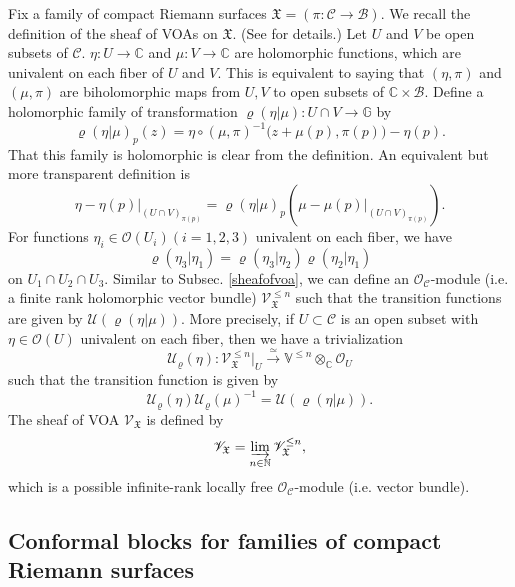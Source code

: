 \documentclass[11pt,b5paper,notitlepage]{article}
\theoremstyle{definition}
\theoremstyle{plain}
\newcommand{\mc}{\mathcal}
\newcommand{\SV}{\mathscr{V}}
\newcommand{\Vbb}{\mathbb V}
\newcommand{\Gbb}{\mathbb G}
\newcommand{\Cbb}{\mathbb C}
\newcommand{\Nbb}{\mathbb N}
\newcommand{\<}{\left\langle}
\renewcommand{\>}{\right\rangle}
\newcommand{\MO}{\mathcal{O}}
\newcommand{\MU}{\mathcal{U}}
\newcommand{\MC}{\mathcal{C}}
\newcommand{\MB}{\mathcal{B}}
\newcommand{\fx}{\mathfrak{X}}
\numberwithin{equation}{subsection}
\begin{document}
Fix a family of compact Riemann surfaces $\fx=(\pi:\MC\rightarrow \MB)$. We recall the definition of the sheaf of VOAs on $\fx$. (See \cite[Sec. 5]{Gui-sewingconvergence} for details.) Let $U$ and $V$ be open subsets of $\MC$. $\eta:U\rightarrow \Cbb$ and $\mu:V\rightarrow \Cbb$ are holomorphic functions, which are univalent on each fiber of $U$ and $V$. This is equivalent to saying that $(\eta,\pi)$ and $(\mu,\pi)$ are biholomorphic maps from $U,V$ to open subsets of $\Cbb\times \MB$. Define a holomorphic family of transformation $\varrho(\eta\vert \mu):U\cap V\rightarrow \Gbb$ by 
$$
\varrho(\eta\vert \mu)_p(z)=\eta\circ (\mu,\pi)^{-1}\big(z+\mu(p),\pi(p)\big)-\eta(p).
$$
That this family is holomorphic is clear from the definition. An equivalent but more transparent definition is
$$
\eta-\eta(p)\vert_{(U\cap V)_{\pi(p)}}=\varrho(\eta\vert \mu)_p(\mu-\mu(p)\vert_{(U\cap V)_{\pi(p)}}).
$$
For functions $\eta_i\in \MO(U_i)(i=1,2,3)$ univalent on each fiber, we have
$$
\varrho(\eta_3\vert \eta_1)=\varrho(\eta_3\vert \eta_2)\varrho(\eta_2\vert \eta_1)
$$
on $U_1\cap U_2\cap U_3$. Similar to Subsec. \ref{sheafofvoa}, we can define an $\mc O_{\mc C}$-module  (i.e. a finite rank holomorphic vector bundle) $\SV_{\fx}^{\leq n}$ such that the transition functions are given by $\MU(\varrho(\eta\vert \mu))$. More precisely, if $U\subset \MC$ is an open subset with $\eta\in \MO(U)$ univalent on each fiber, then we have a trivialization
$$
\MU_\varrho(\eta):\SV_\fx^{\leq n}\vert_{U}\xrightarrow{\simeq }\Vbb^{\leq n}\otimes_{\Cbb} \MO_U
$$
such that the transition function is given by
$$
\MU_\varrho(\eta)\MU_\varrho(\mu)^{-1}=\MU(\varrho(\eta\vert \mu)).
$$
The sheaf of VOA $\SV_\fx$ is defined by 
$$
\SV_\fx=\varinjlim_{n\in \Nbb} \SV_\fx^{\leq n},
$$
which is a possible infinite-rank locally free $\mc O_{\mc C}$-module (i.e. vector bundle).




\subsection{Conformal blocks for families of compact Riemann surfaces}
\end{document}
